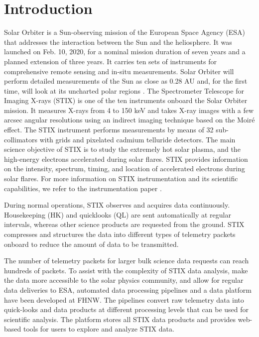 \documentclass[referee]{preaa} %
\begin{document}
\section{Introduction}
Solar Orbiter is a Sun-observing mission of the European Space Agency (ESA) that 
addresses the interaction between the Sun and the heliosphere. It was launched on Feb. 10, 2020, for a nominal mission duration of seven years and a planned 
extension of three years. It carries ten sets of instruments for comprehensive
remote sensing and in-situ measurements.
Solar Orbiter will perform detailed measurements of the Sun as close as 0.28 AU and, for the first time, will look at its uncharted polar regions \citep{SolarOrbiter2020}.  
The Spectrometer Telescope for Imaging X-rays (STIX) is one of the ten instruments onboard the Solar Orbiter mission.  
It measures X-rays from 4 to 150 keV and takes X-ray images with a few arcsec angular resolutions using an indirect imaging technique based on the Moiré effect. The STIX instrument performs measurements by means of 32 sub-collimators with grids and pixelated cadmium telluride detectors. The main science objective of STIX is to study the extremely hot solar plasma, and the high-energy electrons accelerated during solar flares. STIX provides information on the intensity, spectrum, timing, and location of accelerated electrons during solar flares. For more information on STIX instrumentation and its scientific capabilities, we refer to the instrumentation paper \citep{stix2020}.

During normal operations, STIX observes and acquires data continuously. Housekeeping (HK) and quicklooks (QL) are sent automatically at regular intervals, whereas other science products are requested from the ground. STIX compresses and structures the data into different types of telemetry packets onboard to reduce the amount of data to be transmitted.

The number of telemetry packets for larger bulk science data requests can reach hundreds of packets. To assist with the complexity of STIX data analysis, make the data more accessible to the solar physics community, and allow for regular data deliveries to ESA, automated data processing pipelines and a data platform have been developed at FHNW. The pipelines convert raw telemetry data into quick-looks and data products at different processing levels that can be used for scientific analysis. The platform stores all STIX data products and provides web-based tools for users to explore and analyze STIX data.
\end{document}
